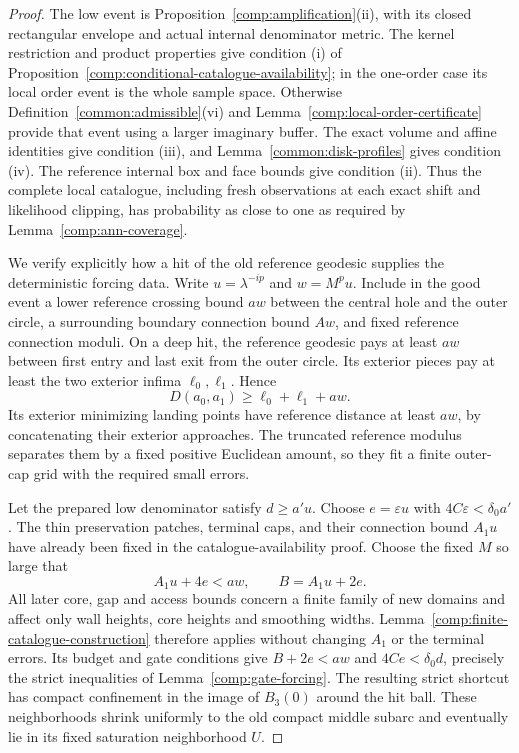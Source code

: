 \begin{proof}
The low event is Proposition~\ref{comp:amplification}(ii), with its
closed rectangular envelope and actual internal denominator metric.
The kernel restriction and product properties give condition (i) of
Proposition~\ref{comp:conditional-catalogue-availability}; in the
one-order case its local order event is the whole sample space.
Otherwise Definition~\ref{common:admissible}(vi) and
Lemma~\ref{comp:local-order-certificate} provide that event using a
larger imaginary buffer.  The exact volume and affine identities give
condition (iii), and Lemma~\ref{common:disk-profiles} gives condition
(iv).  The reference internal box and face bounds give condition (ii).
Thus the complete local catalogue, including fresh observations at each
exact shift and likelihood clipping, has probability as close to one
as required by Lemma~\ref{comp:ann-coverage}.

We verify explicitly how a hit of the old reference geodesic supplies
the deterministic forcing data.  Write $u=\lambda^{-ip}$ and
$w=M^p u$.  Include in the good event a lower reference crossing bound
$aw$ between the central hole and the outer circle, a surrounding
boundary connection bound $Aw$, and fixed reference connection moduli.
On a deep hit, the reference geodesic pays at least $aw$ between first
entry and last exit from the outer circle.  Its exterior pieces pay
at least the two exterior infima $\ell_0,\ell_1$.  Hence
\[
 D(a_0,a_1)\ge\ell_0+\ell_1+aw.
\]
Its exterior minimizing landing points have reference distance at
least $aw$, by concatenating their exterior approaches.  The truncated
reference modulus separates them by a fixed positive Euclidean amount,
so they fit a finite outer-cap grid with the required small errors.

Let the prepared low denominator satisfy $d\ge a'u$.  Choose
$e=\varepsilon u$ with $4C\varepsilon<\delta_0a'$.  The thin
preservation patches, terminal caps, and their connection bound $A_1u$
have already been fixed in the catalogue-availability proof.  Choose
the fixed $M$ so large that
\[
 A_1u+4e<aw,
 \qquad B=A_1u+2e.
\]
All later core, gap and access bounds concern a finite family of
new domains and affect only wall heights, core heights and smoothing
widths.  Lemma~\ref{comp:finite-catalogue-construction} therefore
applies without changing $A_1$ or the terminal errors.  Its budget and
gate conditions give $B+2e<aw$ and $4Ce<\delta_0d$, precisely the
strict inequalities of Lemma~\ref{comp:gate-forcing}.
The resulting strict shortcut has compact confinement in the image
of $B_3(0)$ around the hit ball.  These neighborhoods shrink uniformly
to the old compact middle subarc and eventually lie in its fixed
saturation neighborhood $U$.


\end{proof}
